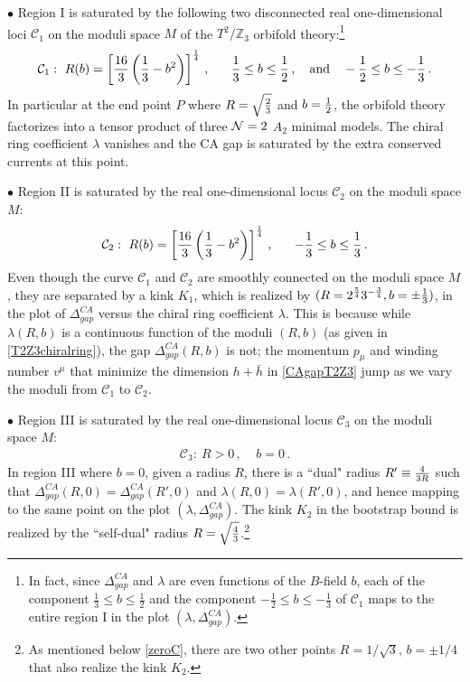 \documentclass[12pt]{article}
\begin{document}
\noindent $\bullet$ Region I is saturated by the following two disconnected real one-dimensional loci $\mathcal{C}_1$ on the moduli space $M$  of the $T^2/\mathbb{Z}_3$ orbifold theory:\footnote{In fact, since  $\Delta^{CA}_{gap}$ and $\lambda$ are even functions of the $B$-field $b$, each of  the component $\frac13 \le b\le \frac12$ and the component $-\frac12 \le b\le -\frac13$ of $\mathcal{C}_1$ maps to the entire region I in the plot $(\lambda, \Delta^{CA}_{gap})$.}
\begin{align}
\mathcal{C}_1:~ R(b) =  \left[ {16\over 3}  \left( {1\over3} -b^2 \right) \right]^{1\over4}\,,~~~~~\frac13 \le b \le \frac12\,,~~~\text{and}~~~-\frac12 \le b\le -\frac13\,.
\end{align}
In particular at the end point $P$ where $R=\sqrt{2\over 3}$ and $b={1\over 2}$, the orbifold theory factorizes into a tensor product of three ${\mathcal N}=2$ $A_2$ minimal models. The chiral ring coefficient $\lambda$ vanishes and the CA gap is saturated by the extra conserved currents at this point.

\noindent $\bullet$ Region II is saturated by the real one-dimensional locus $\mathcal{C}_2$ on the moduli space $M$:
\begin{align}
\mathcal{C}_2:~ R(b) =  \left[ {16\over 3}  \left( {1\over3} -b^2 \right) \right]^{1\over4}\,,~~~~~-\frac13 \le b \le \frac13\,.
\end{align}
Even though the curve $\mathcal{C}_1$ and $\mathcal{C}_2$ are smoothly connected on the moduli space $M$, they are separated by a kink $K_1$, which is realized by $(R= {2^{5\over 4} 3^{-{3\over4}}}, b=\pm \frac13)$,  in the plot of $\Delta^{CA}_{gap}$ versus the chiral ring coefficient $\lambda$.  
This is because while  $\lambda(R,b)$ is a continuous function of the moduli $(R,b)$ (as given in \eqref{T2Z3chiralring}),  the gap $\Delta^{CA}_{gap}(R,b)$ is not; the momentum $p_\mu$ and winding number $v^\mu$ that minimize the dimension $h+\bar h$ in \eqref{CAgapT2Z3}  jump  as we vary the moduli from $\mathcal{C}_1$ to $\mathcal{C}_2$.  

\noindent $\bullet$ Region III is saturated by the  real one-dimensional locus $\mathcal{C}_3$ on the moduli space $M$:
\begin{align}
\mathcal{C}_3:~R>0\,,~~~~~b=0\,.
\end{align}
In region III where $b=0$, given a radius $R$, there is a ``dual" radius $R' \equiv {4\over 3R}$ such that $\Delta^{CA}_{gap}(R,0)=\Delta^{CA}_{gap}(R',0)$ and $\lambda(R,0)  =\lambda(R',0)$, and hence mapping to the same point on the plot $(\lambda,\Delta^{CA}_{gap})$.  The kink $K_2$ in the bootstrap bound is realized by the ``self-dual" radius $R= \sqrt{4\over3}$.\footnote{As mentioned below \eqref{zeroC}, there are two other points $R=1/\sqrt{3}$, $b=\pm 1/4$ that also realize the kink $K_2$.}
\end{document}
